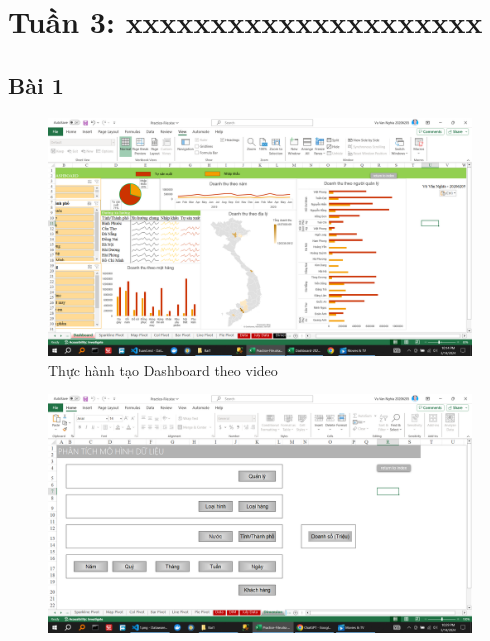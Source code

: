 \documentclass{article}
\begin{document}
\tableofcontents
\newpage
\listoffigures
\newpage
\section{Tuần 3: xxxxxxxxxxxxxxxxxxxxx}
\subsection{Bài 1}



\begin{figure}[H]
\centering
\includegraphics[scale = 0.15]{Bai1/ThucHanh/0.png}
\caption{Thực hành tạo Dashboard theo video}
\end{figure}












\begin{figure}[H]
    \centering
    \includegraphics[scale = 0.15]{Bai1/ThucHanh/1.png}
    \end{figure}
\end{document}
